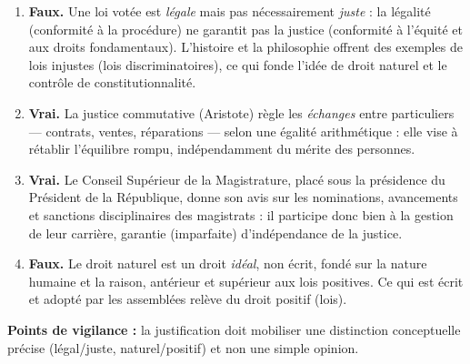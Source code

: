 \documentclass[11pt]{article}
\begin{document}
\begin{corrige}
\begin{enumerate}
\item \textbf{Faux.} Une loi votée est \emph{légale} mais pas nécessairement \emph{juste} : la légalité (conformité à la procédure) ne garantit pas la justice (conformité à l'équité et aux droits fondamentaux). L'histoire et la philosophie offrent des exemples de lois injustes (lois discriminatoires), ce qui fonde l'idée de droit naturel et le contrôle de constitutionnalité.
\item \textbf{Vrai.} La justice commutative (Aristote) règle les \emph{échanges} entre particuliers — contrats, ventes, réparations — selon une égalité arithmétique : elle vise à rétablir l'équilibre rompu, indépendamment du mérite des personnes.
\item \textbf{Vrai.} Le Conseil Supérieur de la Magistrature, placé sous la présidence du Président de la République, donne son avis sur les nominations, avancements et sanctions disciplinaires des magistrats : il participe donc bien à la gestion de leur carrière, garantie (imparfaite) d'indépendance de la justice.
\item \textbf{Faux.} Le droit naturel est un droit \emph{idéal}, non écrit, fondé sur la nature humaine et la raison, antérieur et supérieur aux lois positives. Ce qui est écrit et adopté par les assemblées relève du droit positif (lois).
\end{enumerate}
\textbf{Points de vigilance :} la justification doit mobiliser une distinction conceptuelle précise (légal/juste, naturel/positif) et non une simple opinion.
\end{corrige}
\end{document}
